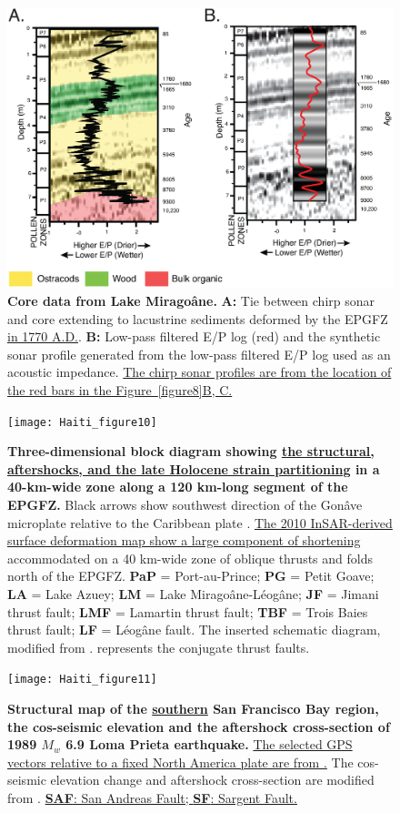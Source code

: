 \documentclass[linenumbers,draft]{agujournal}
\begin{document}
\begin{figure}
\centering
\includegraphics[width=\textwidth]{Haiti_figure9}
\caption{\textbf{Core data from Lake Mirago\^ane.} \textbf{A:} Tie between chirp sonar and core \citep{higuera199910} extending to lacustrine sediments deformed by the EPGFZ \underline{in 1770 A.D.}. \textbf{B:} Low-pass filtered E/P log (red) and the synthetic sonar profile generated from the low-pass filtered E/P log used as an acoustic impedance. \underline{The chirp sonar profiles are from the location of the red bars in the Figure~\ref{figure8}B, C.}}
\label{figure9}
\end{figure}

\begin{figure}
\centering
\texttt{[image: Haiti\_figure10]}
\caption{\textbf{Three-dimensional block diagram showing \ul{the structural, aftershocks, and the late Holocene strain partitioning} in a 40-km-wide zone along a 120 km-long segment of the EPGFZ.} Black arrows show southwest direction of the Gon\^ave microplate relative to the Caribbean plate \underline{\citep{calais2010transpressional}}. \ul{The 2010 InSAR-derived surface deformation map show a large component of shortening} accommodated on a 40 km-wide zone of oblique thrusts and folds north of the EPGFZ. \textbf{PaP} = Port-au-Prince; \textbf{PG} = Petit Goave; \textbf{LA} = Lake Azuey; \textbf{LM} = Lake Mirago\^ane-L\'eog\^ane; \textbf{JF} = Jimani thrust fault; \textbf{LMF} = Lamartin thrust fault; \textbf{TBF} = Trois Baies thrust fault; \textbf{LF} = L\'eog\^ane fault. The inserted schematic diagram, modified from \citet{sibson2012reverse}. represents the conjugate thrust faults.}
\label{figure10}
\end{figure}

\begin{figure}
\centering
\texttt{[image: Haiti\_figure11]}
\caption{\textbf{Structural map of the \ul{southern} San Francisco Bay region, the cos-seismic elevation and the aftershock cross-section of 1989 $M_w$ 6.9  Loma Prieta earthquake.} \ul{The selected GPS vectors relative to a fixed North America plate are from}\underline{ \citet{UNAVCO2009}.} The cos-seismic elevation change and aftershock cross-section are modified from \citet{marshall1991faulting}. \ul{\textbf{SAF}: San Andreas Fault; \textbf{SF}: Sargent Fault.}}
\label{figure11}
\end{figure}
\end{document}

